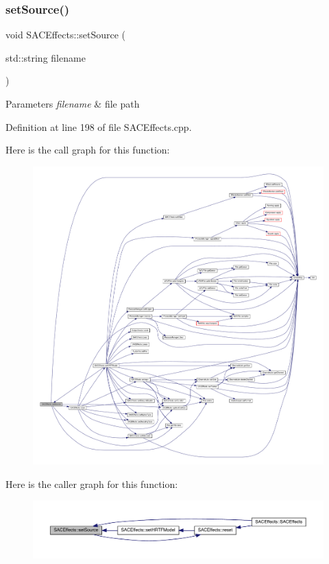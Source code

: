 \subsubsection{\texorpdfstring{set\+Source()}{setSource()}}
{\footnotesize\ttfamily void S\+A\+C\+Effects\+::set\+Source (\begin{DoxyParamCaption}\item[{std\+::string}]{filename }\end{DoxyParamCaption})}


\begin{DoxyParams}{Parameters}
{\em filename} & file path \\
\hline
\end{DoxyParams}


Definition at line 198 of file S\+A\+C\+Effects.\+cpp.

Here is the call graph for this function\+:
\nopagebreak
\begin{figure}[H]
\begin{center}
\leavevmode
\includegraphics[width=350pt]{class_s_a_c_effects_aaa9092eb132a8fe2b0560b3a600747b5_cgraph}
\end{center}
\end{figure}
Here is the caller graph for this function\+:
\nopagebreak
\begin{figure}[H]
\begin{center}
\leavevmode
\includegraphics[width=350pt]{class_s_a_c_effects_aaa9092eb132a8fe2b0560b3a600747b5_icgraph}
\end{center}
\end{figure}
\mbox{\label{class_s_a_c_effects_afd3f1f8b005595d4adf06d67c2bd556c}} 
